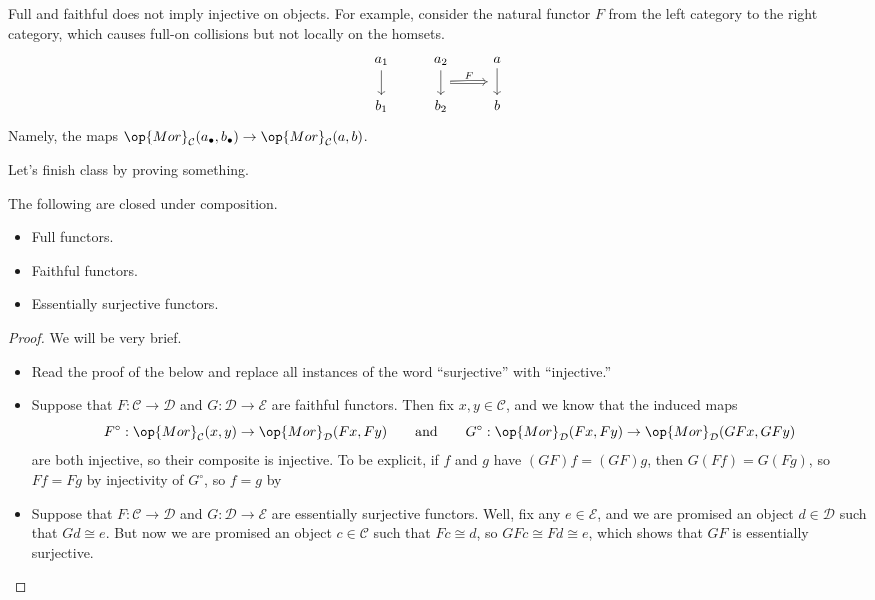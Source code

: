 \begin{example}
	Full and faithful does not imply injective on objects. For example, consider the natural functor $F$ from the left category to the right category, which causes full-on collisions but not locally on the homsets.
	\[\begin{tikzcd}
		{a_1} & {a_2} & a \\
		{b_1} & {b_2} & b
		\arrow[from=1-1, to=2-1]
		\arrow[""{name=0, anchor=center, inner sep=0}, from=1-2, to=2-2]
		\arrow[""{name=1, anchor=center, inner sep=0}, from=1-3, to=2-3]
		\arrow["F", shorten <=6pt, shorten >=6pt, Rightarrow, from=0, to=1]
	\end{tikzcd}\]
	Namely, the maps $\op{Mor}_\mathcal C(a_\bullet,b_\bullet)\to\op{Mor}_\mathcal C(a,b)$.
\end{example}
Let's finish class by proving something.
\begin{prop}
	The following are closed under composition.
	\begin{itemize}
		\item Full functors.
		\item Faithful functors.
		\item Essentially surjective functors.
	\end{itemize}
\end{prop}
\begin{proof}
	We will be very brief.
	\begin{itemize}
		\item Read the proof of the below and replace all instances of the word ``surjective'' with ``injective.''
		\item Suppose that $F:\mathcal C\to\mathcal D$ and $G:\mathcal D\to\mathcal E$ are faithful functors. Then fix $x,y\in\mathcal C$, and we know that the induced maps
		\[F^\circ:\op{Mor}_\mathcal C(x,y)\to\op{Mor}_\mathcal D(Fx,Fy)\qquad\text{and}\qquad G^\circ:\op{Mor}_\mathcal D(Fx,Fy)\to\op{Mor}_\mathcal D(GFx,GFy)\]
		are both injective, so their composite is injective. To be explicit, if $f$ and $g$ have $(GF)f=(GF)g$, then $G(Ff)=G(Fg)$, so $Ff=Fg$ by injectivity of $G^\circ$, so $f=g$ by 
		\item Suppose that $F:\mathcal C\to\mathcal D$ and $G:\mathcal D\to\mathcal E$ are essentially surjective functors. Well, fix any $e\in\mathcal E$, and we are promised an object $d\in\mathcal D$ such that $Gd\cong e$. But now we are promised an object $c\in\mathcal C$ such that $Fc\cong d$, so $GFc\cong Fd\cong e$, which shows that $GF$ is essentially surjective.
		\qedhere
	\end{itemize}
\end{proof}